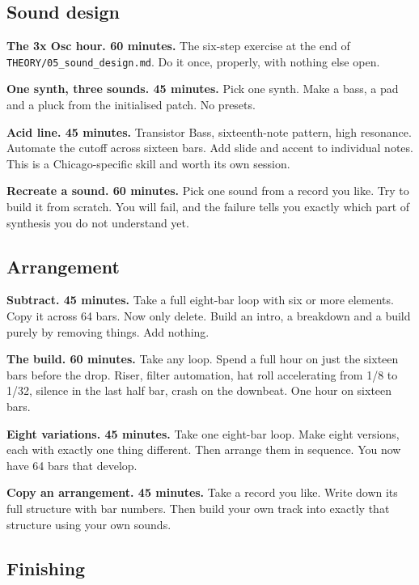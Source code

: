 \subsection{Sound design}\label{pr02_exercises-sound-design}

\textbf{The 3x Osc hour. 60 minutes.}
The six-step exercise at the end of \texttt{THEORY/05\_sound\_design.md}. Do it once, properly, with
nothing else open.

\textbf{One synth, three sounds. 45 minutes.}
Pick one synth. Make a bass, a pad and a pluck from the initialised patch. No presets.

\textbf{Acid line. 45 minutes.}
Transistor Bass, sixteenth-note pattern, high resonance. Automate the cutoff across sixteen
bars. Add slide and accent to individual notes. This is a Chicago-specific skill and worth
its own session.

\textbf{Recreate a sound. 60 minutes.}
Pick one sound from a record you like. Try to build it from scratch. You will fail, and the
failure tells you exactly which part of synthesis you do not understand yet.

\subsection{Arrangement}\label{pr02_exercises-arrangement}

\textbf{Subtract. 45 minutes.}
Take a full eight-bar loop with six or more elements. Copy it across 64 bars. Now only
delete. Build an intro, a breakdown and a build purely by removing things. Add nothing.

\textbf{The build. 60 minutes.}
Take any loop. Spend a full hour on just the sixteen bars before the drop. Riser, filter
automation, hat roll accelerating from 1/8 to 1/32, silence in the last half bar, crash on
the downbeat. One hour on sixteen bars.

\textbf{Eight variations. 45 minutes.}
Take one eight-bar loop. Make eight versions, each with exactly one thing different. Then
arrange them in sequence. You now have 64 bars that develop.

\textbf{Copy an arrangement. 45 minutes.}
Take a record you like. Write down its full structure with bar numbers. Then build your own
track into exactly that structure using your own sounds.

\subsection{Finishing}\label{pr02_exercises-finishing}

